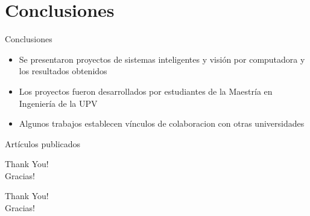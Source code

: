 \documentclass[aspectratio=169,compress]{beamer}
\begin{document}





\section{Conclusiones}
\begin{frame}{Conclusiones}
\begin{itemize}
\item Se presentaron proyectos de sistemas inteligentes y visión por computadora y los resultados obtenidos
\item Los proyectos fueron desarrollados por estudiantes de la Maestría en Ingeniería de la UPV
\item Algunos trabajos establecen vínculos de colaboracion con otras universidades
\end{itemize}
\end{frame}




\renewcommand*{\bibfont}{\tiny}
\begin{frame}[allowframebreaks]{Artículos publicados}
    \printbibliography[title=Artículos publicados,keyword=primary]
\end{frame}

\begin{frame}%
\begin{center}
\Huge Thank You! \\
\Huge Gracias! \\
\end{center}
\end{frame}

\begin{frame}%
\begin{center}
{\fontsize{40}{50}\selectfont Thank You!}\\
{\fontsize{40}{50}\selectfont Gracias!}
\end{center}
\end{frame}
\end{document}
